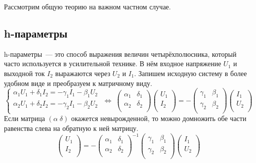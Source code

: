 \documentclass[11pt,a4paper]{article}
\begin{document}
Рассмотрим общую теорию на важном частном случае.
\subsection{h-параметры}
h-параметры~--- это способ выражения величин четырёхполюсника, который часто используется в усилительной технике. В нём входное 
напряжение $U_1$ и выходной ток $I_2$ выражаются через $U_2$ и $I_1$. Запишем исходную систему в более удобном виде и 
преобразуем к матричному виду.
$$
\begin{cases}
\alpha_1U_1 + \delta_1I_2 = -\gamma_1I_1 -\beta_1U_2 \\
\alpha_2U_1 + \delta_2I_2 = -\gamma_2I_1 -\beta_2U_2 \\
\end{cases}
\; \Leftrightarrow \;
\begin{pmatrix}
\alpha_1 & \delta_1 \\ \alpha_2 & \delta_2\\
\end{pmatrix}
\begin{pmatrix} U_1\\ I_2\\\end{pmatrix}
=-
\begin{pmatrix}
\gamma_1 & \beta_1 \\ \gamma_2 & \beta_2\\
\end{pmatrix}
\begin{pmatrix} I_1\\ U_2\\\end{pmatrix}
$$
Если матрица $(\alpha \; \delta)$ окажется невырожденной, то можно домножить обе части равенства слева на обратную к ней матрицу.
$$
\begin{pmatrix} U_1\\ I_2\\\end{pmatrix}
=-
\begin{pmatrix}
\alpha_1 & \delta_1 \\ \alpha_2 & \delta_2\\
\end{pmatrix}^{-1}
\begin{pmatrix}
\gamma_1 & \beta_1 \\ \gamma_2 & \beta_2\\
\end{pmatrix}
\begin{pmatrix} I_1\\ U_2\\\end{pmatrix}
$$
\end{document}

